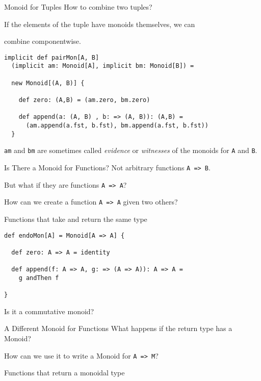 \documentclass{beamer}
\begin{document}
\begin{framej}
\begin{frame}[fragile]{Monoid for Tuples}
  How to combine two tuples?
  \pause

  If the elements of the tuple have monoids themselves,
  we can

  \alert{combine componentwise}.

  \pause
  \begin{block}{}
  \begin{lstlisting}
implicit def pairMon[A, B]
  (implicit am: Monoid[A], implicit bm: Monoid[B]) =

  new Monoid[(A, B)] {

    def zero: (A,B) = (am.zero, bm.zero)

    def append(a: (A, B) , b: => (A, B)): (A,B) =
      (am.append(a.fst, b.fst), bm.append(a.fst, b.fst))
  }
  \end{lstlisting}
  \end{block}

  \texttt{am} and \texttt{bm} are sometimes called \emph{evidence} or
  \emph{witnesses} of the monoids for \texttt{A} and \texttt{B}.
\end{frame}


\begin{frame}[fragile]{Is There a Monoid for Functions?}
  Not arbitrary functions \texttt{A => B}.

  But what if they are functions \texttt{A => A}?

  How can we create a function \texttt{A => A} given two others?
  \pause
  \begin{block}{Functions that take and return the same type}

  \begin{lstlisting}
def endoMon[A] = Monoid[A => A] {

  def zero: A => A = identity

  def append(f: A => A, g: => (A => A)): A => A =
    g andThen f

}
  \end{lstlisting}
  \end{block}
Is it a commutative monoid?
\end{frame}


\begin{frame}[fragile]{A Different Monoid for Functions}
  What happens if the \alert{return type has a Monoid?}

  How can we use it to write a Monoid for \texttt{A => M}?

  \begin{block}{Functions that return a monoidal type}


\end{block}
\end{frame}
\end{framej}
\end{document}
